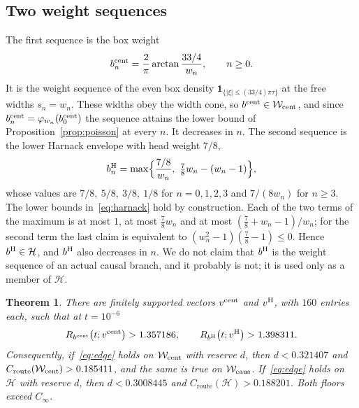 \documentclass[10pt]{article}
\newtheorem{theorem}{Theorem}
\theoremstyle{remark}
\newcommand{\Cinf}{C_\infty}
\newcommand{\Croute}{C_{\mathrm{route}}}
\begin{document}
\subsection{Two weight sequences}

The first sequence is the box weight
\[
b^{\rm cent}_n=\frac2\pi\arctan\frac{33/4}{w_n},\qquad n\ge0 .
\]
It is the weight sequence of the even box density $\mathbf 1_{\{|\xi|\le(33/4)\pi\tau\}}$ at the free widths $s_n=w_n$. These widths obey the width cone, so $b^{\rm cent}\in\mathcal W_{\rm cent}$, and since $b^{\rm cent}_n=\varphi_{w_n}(b^{\rm cent}_0)$ the sequence attains the lower bound of Proposition~\ref{prop:poisson} at every $n$. It decreases in $n$. The second sequence is the lower Harnack envelope with head weight $7/8$,
\[
b^{\rm H}_n=\max\Bigl\{\frac{7/8}{w_n},\ \tfrac78w_n-(w_n-1)\Bigr\},
\]
whose values are $7/8,\ 5/8,\ 3/8,\ 1/8$ for $n=0,1,2,3$ and $7/(8w_n)$ for $n\ge3$. The lower bounds in~\eqref{eq:harnack} hold by construction. Each of the two terms of the maximum is at most $1$, at most $\frac78w_n$ and at most $(\frac78+w_n-1)/w_n$; for the second term the last claim is equivalent to $(w_n^2-1)(\frac78-1)\le0$. Hence $b^{\rm H}\in\mathcal H$, and $b^{\rm H}$ also decreases in $n$. We do not claim that $b^{\rm H}$ is the weight sequence of an actual causal branch, and it probably is not; it is used only as a member of $\mathcal H$.

\begin{theorem}\label{thm:barrier}
There are finitely supported vectors $v^{\rm cent}$ and $v^{\rm H}$, with $160$ entries each, such that at $t=10^{-6}$
\[
R_{b^{\rm cent}}\bigl(t;v^{\rm cent}\bigr)>1.357186,\qquad R_{b^{\rm H}}\bigl(t;v^{\rm H}\bigr)>1.398311 .
\]
Consequently, if~\eqref{eq:edge} holds on $\mathcal W_{\rm cent}$ with reserve $d$, then $d<0.321407$ and $\Croute(\mathcal W_{\rm cent})>0.185411$, and the same is true on $\mathcal W_{\rm caus}$. If~\eqref{eq:edge} holds on $\mathcal H$ with reserve $d$, then $d<0.3008445$ and $\Croute(\mathcal H)>0.188201$. Both floors exceed $\Cinf$.
\end{theorem}
\end{document}
